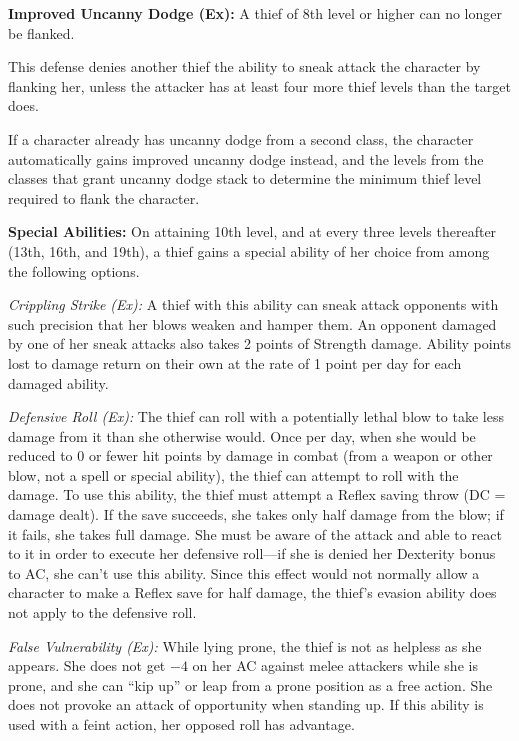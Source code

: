 \textbf{Improved Uncanny Dodge (Ex):} A thief of 8th level or higher can no longer be flanked.

This defense denies another thief the ability to sneak attack the character by flanking her, unless the attacker has at least four more thief levels than the target does.

If a character already has uncanny dodge from a second class, the character automatically gains improved uncanny dodge instead, and the levels from the classes that grant uncanny dodge stack to determine the minimum thief level required to flank the character.

\textbf{Special Abilities:} On attaining 10th level, and at every three levels thereafter (13th, 16th, and 19th), a thief gains a special ability of her choice from among the following options.

\textit{Crippling Strike (Ex):} A thief with this ability can sneak attack opponents with such precision that her blows weaken and hamper them. An opponent damaged by one of her sneak attacks also takes 2 points of Strength damage. Ability points lost to damage return on their own at the rate of 1 point per day for each damaged ability.

\textit{Defensive Roll (Ex):} The thief can roll with a potentially lethal blow to take less damage from it than she otherwise would. Once per day, when she would be reduced to 0 or fewer hit points by damage in combat (from a weapon or other blow, not a spell or special ability), the thief can attempt to roll with the damage. To use this ability, the thief must attempt a Reflex saving throw (DC = damage dealt). If the save succeeds, she takes only half damage from the blow; if it fails, she takes full damage. She must be aware of the attack and able to react to it in order to execute her defensive roll---if she is denied her Dexterity bonus to AC, she can't use this ability. Since this effect would not normally allow a character to make a Reflex save for half damage, the thief's evasion ability does not apply to the defensive roll.


\textit{False Vulnerability (Ex):} While lying prone, the thief is not as helpless as she appears. She does not get $-4$ on her AC against melee attackers while she is prone, and she can ``kip up'' or leap from a prone position as a free action. She does not provoke an attack of opportunity when standing up. If this ability is used with a feint action, her opposed  roll has advantage.

